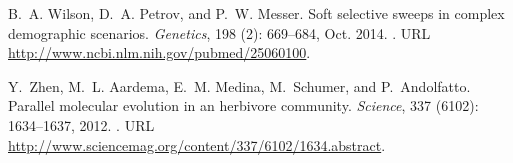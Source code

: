 \documentclass[10pt,letterpaper]{article}
\begin{document}
\begin{thebibliography}{68}
B.~A. Wilson, D.~A. Petrov, and P.~W. Messer.
\newblock Soft selective sweeps in complex demographic scenarios.
\newblock \emph{Genetics}, 198 (2): 669--684, Oct. 2014.
\newblock {}.
\newblock URL \url{http://www.ncbi.nlm.nih.gov/pubmed/25060100}.

Y.~Zhen, M.~L. Aardema, E.~M. Medina, M.~Schumer, and P.~Andolfatto.
\newblock Parallel molecular evolution in an herbivore community.
\newblock \emph{Science}, 337 (6102): 1634--1637, 2012.
\newblock {}.
\newblock URL \url{http://www.sciencemag.org/content/337/6102/1634.abstract}.

\end{thebibliography}
\end{document}
